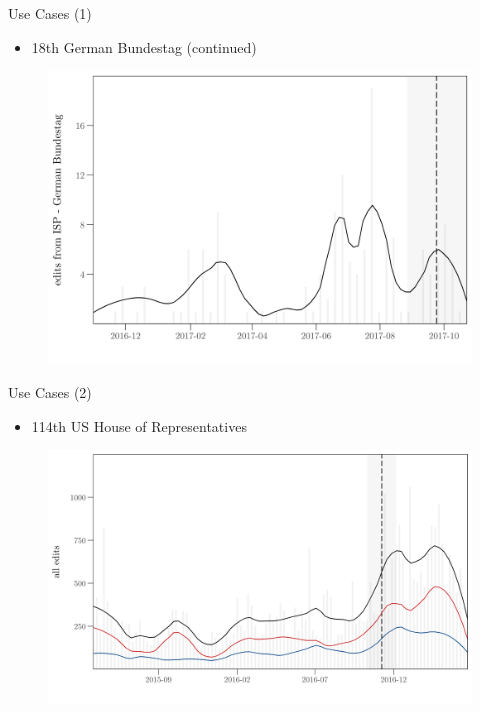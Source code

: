 \begin{frame}{Use Cases (1)}
\begin{itemize}
\item 18th German Bundestag (continued)
\end{itemize}
\begin{figure}[t]
\begin{center}
\vspace{-.1cm}
	\includegraphics[scale=.63]{uc_1_germany_time.png}
	\vspace{-.5cm}
\end{center}
\end{figure}
\end{frame}

\begin{frame}{Use Cases (2)}
\begin{itemize}
\item 114th US House of Representatives
\end{itemize}
\begin{figure}[t]
\begin{center}
\vspace{-.1cm}
	\includegraphics[scale=.55]{uc_2_usah_time1.png}
	\vspace{-.5cm}
\end{center}
\end{figure}
\end{frame}

